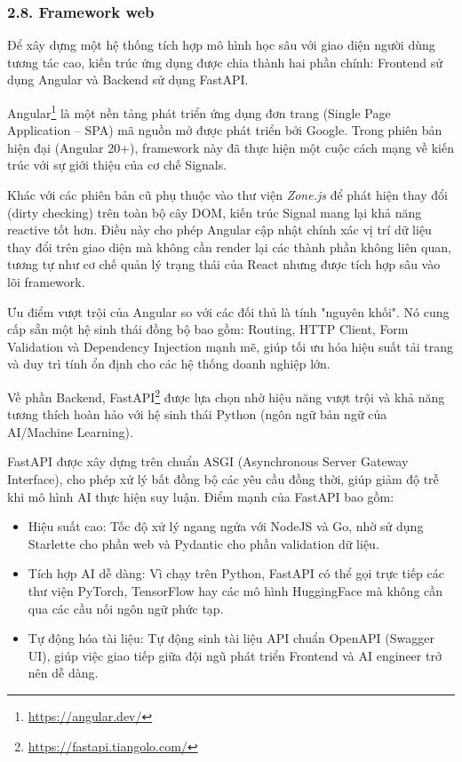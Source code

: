 \subsubsection{2.8. Framework web}
\indent\indent Để xây dựng một hệ thống tích hợp mô hình học sâu với giao diện người dùng tương tác cao, kiến trúc ứng dụng được chia thành hai phần chính: Frontend sử dụng Angular và Backend sử dụng FastAPI.\vspace{0.3cm}

Angular\footnote{\url{https://angular.dev/}} là một nền tảng phát triển ứng dụng đơn trang (Single Page Application -- SPA) mã nguồn mở được phát triển bởi Google. Trong phiên bản hiện đại (Angular 20+), framework này đã thực hiện một cuộc cách mạng về kiến trúc với sự giới thiệu của cơ chế Signals.\vspace{0.3cm}

Khác với các phiên bản cũ phụ thuộc vào thư viện \textit{Zone.js} để phát hiện thay đổi (dirty checking) trên toàn bộ cây DOM, kiến trúc Signal mang lại khả năng reactive tốt hơn. Điều này cho phép Angular cập nhật chính xác vị trí dữ liệu thay đổi trên giao diện mà không cần render lại các thành phần không liên quan, tương tự như cơ chế quản lý trạng thái của React nhưng được tích hợp sâu vào lõi framework.\vspace{0.3cm}

Ưu điểm vượt trội của Angular so với các đối thủ là tính "nguyên khối". Nó cung cấp sẵn một hệ sinh thái đồng bộ bao gồm: Routing, HTTP Client, Form Validation và Dependency Injection mạnh mẽ, giúp tối ưu hóa hiệu suất tải trang và duy trì tính ổn định cho các hệ thống doanh nghiệp lớn.\vspace{0.3cm}

Về phần Backend, FastAPI\footnote{\url{https://fastapi.tiangolo.com/}} được lựa chọn nhờ hiệu năng vượt trội và khả năng tương thích hoàn hảo với hệ sinh thái Python (ngôn ngữ bản ngữ của AI/Machine Learning).\vspace{0.3cm}

FastAPI được xây dựng trên chuẩn ASGI (Asynchronous Server Gateway Interface), cho phép xử lý bất đồng bộ các yêu cầu đồng thời, giúp giảm độ trễ khi mô hình AI thực hiện suy luận. Điểm mạnh của FastAPI bao gồm:\vspace{-0.1cm}
\begin{itemize}[label={--}, itemsep=1pt]
    \item Hiệu suất cao: Tốc độ xử lý ngang ngửa với NodeJS và Go, nhờ sử dụng Starlette cho phần web và Pydantic cho phần validation dữ liệu.
    \item Tích hợp AI dễ dàng: Vì chạy trên Python, FastAPI có thể gọi trực tiếp các thư viện PyTorch, TensorFlow hay các mô hình HuggingFace mà không cần qua các cầu nối ngôn ngữ phức tạp.
    \item Tự động hóa tài liệu: Tự động sinh tài liệu API chuẩn OpenAPI (Swagger UI), giúp việc giao tiếp giữa đội ngũ phát triển Frontend và AI engineer trở nên dễ dàng.
\end{itemize}